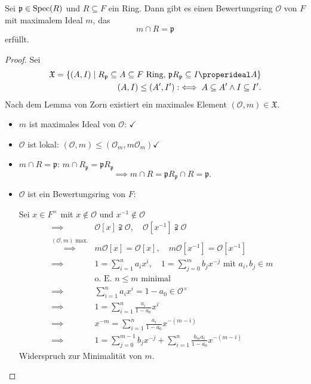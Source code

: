 \begin{theorem}[Chevalley]
    Sei $\mathfrak{p} \in \operatorname{Spec}(R)$ und $R \subseteq F$ ein Ring. Dann gibt es einen Bewertungsring $\mathcal{O}$ von $F$ mit 
    maximalem Ideal $m$, das $$m \cap R = \mathfrak{p}$$ erfüllt.
\end{theorem}
\begin{proof}
    Sei 
    \begin{align*}
        \mathfrak{X}=\{(A,I) \mid R_\mathfrak{p} \subseteq A \subseteq F \text{ Ring, } \mathfrak{p}R_\mathfrak{p} \subseteq I \properideal A\}\\
        (A,I) \leq (A',I') : \iff A \subseteq A' \land I \subseteq I'.
    \end{align*}
    Nach dem Lemma von Zorn existiert ein maximales Element $(\mathcal{O}, m) \in \mathfrak{X}$.
    \begin{itemize}
        \item $m$ ist maximales Ideal von $\mathcal{O}$: $\checkmark$
        \item $\mathcal{O}$ ist lokal: $(\mathcal{O}, m) \leq (\mathcal{O}_m,m\mathcal{O}_m) \checkmark$
        \item $m \cap R = \mathfrak{p}$: $m \cap R_\mathfrak{p} = \mathfrak{p}R_\mathfrak{p}$
        $$ \implies m \cap R = \mathfrak{p}R_\mathfrak{p} \cap R = \mathfrak{p}.$$
        \item $\mathcal{O}$ ist ein Bewertungsring von $F$:
        
        Sei $x \in F^\times$ mit $x \notin \mathcal{O}$ und $x^{-1} \notin \mathcal{O}$
        \begin{align*}
            \implies & \mathcal{O}[x] \supsetneqq \mathcal{O},\quad \mathcal{O}[x^{-1}] \supsetneqq \mathcal{O}\\
            \stackrel{(\mathcal{O},m) \text{ max.}}{\implies}& m\mathcal{O}[x] = \mathcal{O}[x], \quad m\mathcal{O}[x^{-1}]= \mathcal{O}[x^{-1}]\\
            \implies & 1 = \sum\limits_{i=1}^n a_ix^i, \quad 1 = \sum\limits_{j=0}^m b_jx^{-j} \text{ mit } a_i,b_j \in m\\
            &\text{o. E. } n\leq m \text{ minimal}\\
            \implies & \sum\limits_{i=1}^n a_ix^i = 1 - a_0 \in \mathcal{O}^\times \\
            \implies & 1 = \sum\limits_{i=1}^n \frac{a_i}{1 - a_0} x^i\\
            \implies & x^{-m} = \sum\limits_{i=1}^n \frac{a_i}{1-a_0} x ^{-(m-i)}\\
            \implies & 1 = \sum\limits_{j=0}^{m-1} b_j x^{-j} + \sum\limits_{i=1}^n \frac{b_ma_i}{1-a_0}x^{-(m-i)}
        \end{align*}
        Widerspruch zur Minimalität von $m$.
    \end{itemize}
\end{proof}

